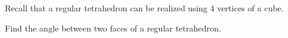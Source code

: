 Recall that a regular tetrahedron can be realized using 4 vertices of a cube.

Find the angle between two faces of a regular tetrahedron.